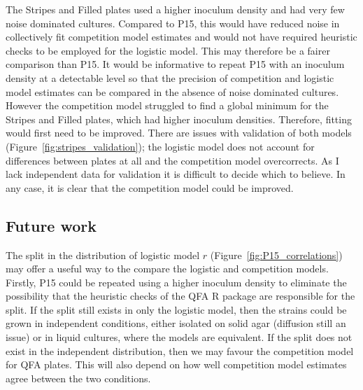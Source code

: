 The Stripes and Filled plates used a higher inoculum density and had
very few noise dominated cultures. Compared to P15, this would have
reduced noise in collectively fit competition model estimates and
would not have required heuristic checks to be employed for the
logistic model. This may therefore be a fairer comparison than P15. It
would be informative to repeat P15 with an inoculum density at a
detectable level so that the precision of competition and logistic
model estimates can be compared in the absence of noise dominated
cultures. However the competition model struggled to find a global
minimum for the Stripes and Filled plates, which had higher inoculum
densities. Therefore, fitting would first need to be improved.
There are issues with validation of both models
(Figure~\ref{fig:stripes_validation}); the logistic model does not
account for differences between plates at all and the competition
model overcorrects. As I lack independent data for validation it is
difficult to decide which to believe.
In any case, it is clear that the competition model could be improved.


\subsection{Future work}

The split in the distribution of logistic model \(r\)
(Figure~\ref{fig:P15_correlations}) may offer a useful way to the
compare the logistic and competition models. Firstly, P15 could be
repeated using a higher inoculum density to eliminate the possibility
that the heuristic checks of the QFA R package are responsible for the
split. If the split still exists in only the logistic model, then the
strains could be grown in independent conditions, either isolated on
solid agar (diffusion still an issue) or in liquid cultures, where the
models are equivalent. If the split does not exist in the independent
distribution, then we may favour the competition model for QFA
plates. This will also depend on how well competition model estimates
agree between the two conditions.

